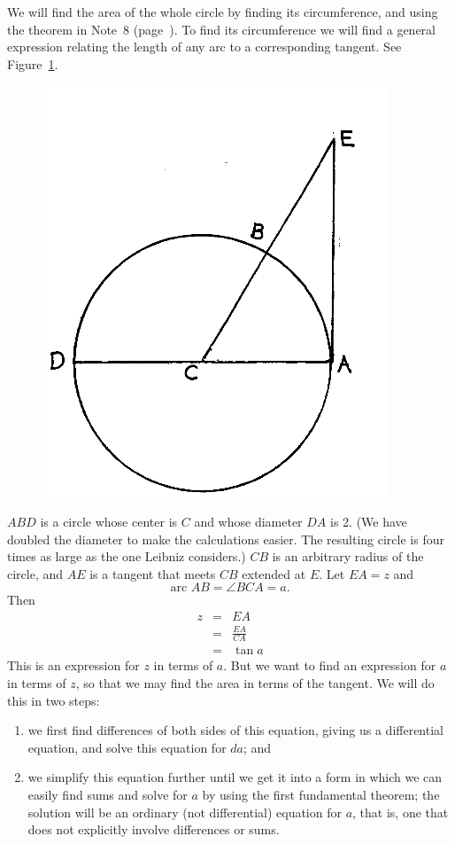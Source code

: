 \documentclass[twoside,openright]{article}
\begin{document}
We will find the area of the whole circle by finding its
circumference, and using the theorem in Note~8
(page~\pageref{secarea}).  To find its circumference we will find a
general expression relating the length of any arc to a corresponding
tangent. See Figure~\ref{circtan}.
\begin{figure}[htp]
  \begin{center}
    \includegraphics[width=.5\textwidth]{fig/Figure61}
    \caption{}
    \label{circtan}
    \vspace{-10pt}
  \end{center}
\end{figure}
$ABD$ is a circle whose center is $C$ and whose diameter $DA$ is
2. (We have doubled the diameter to make the calculations easier.  The
resulting circle is four times as large as the one Leibniz considers.)
$CB$ is an arbitrary radius of the circle, and $AE$ is a tangent that
meets $CB$ extended at $E$.  Let $EA= z$ and
$$\mbox{arc }AB = \angle BCA = a.$$ Then
\setlength{\jot}{1.5ex}
\begin{eqnarray*}
  z & = & EA \\
    & = & \frac{EA}{CA}\\
    & = & \tan a
\end{eqnarray*}
This is an expression for $z$ in terms of $a$.  But we want to find an
expression for $a$ in terms of $z$, so that we may find the area in
terms of the tangent.  We will do this in two steps:
\begin{enumerate}
\item we first find differences of both sides of this equation, giving
  us a differential equation, and solve this equation for $da$; and
\item we simplify this equation further until we get it into a form in
  which we can easily find sums and solve for $a$ by using the first
  fundamental theorem; the solution will be an ordinary (not
  differential) equation for $a$, that is, one that does not
  explicitly involve differences or sums.
\end{enumerate}
\end{document}
